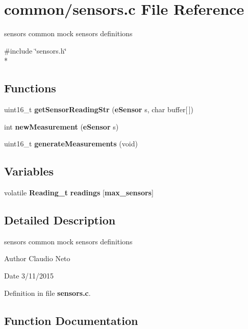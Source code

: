 \section{common/sensors.c File Reference}
\label{sensors_8c}


sensors common mock sensors definitions  


{\ttfamily \#include \char`\"{}sensors.\-h\char`\"{}}\\*
\subsection*{Functions}
\begin{DoxyCompactItemize}
\item 
uint16\-\_\-t {\bf get\-Sensor\-Reading\-Str} ({\bf e\-Sensor} s, char buffer[$\,$])
\item 
int {\bf new\-Measurement} ({\bf e\-Sensor} s)
\item 
uint16\-\_\-t {\bf generate\-Measurements} (void)
\end{DoxyCompactItemize}
\subsection*{Variables}
\begin{DoxyCompactItemize}
\item 
volatile {\bf Reading\-\_\-t} {\bf readings} [{\bf max\-\_\-sensors}]
\end{DoxyCompactItemize}


\subsection{Detailed Description}
sensors common mock sensors definitions \begin{DoxyAuthor}{Author}
Claudio Neto
\end{DoxyAuthor}
\begin{DoxyDate}{Date}
3/11/2015 
\end{DoxyDate}


Definition in file {\bf sensors.\-c}.



\subsection{Function Documentation}
